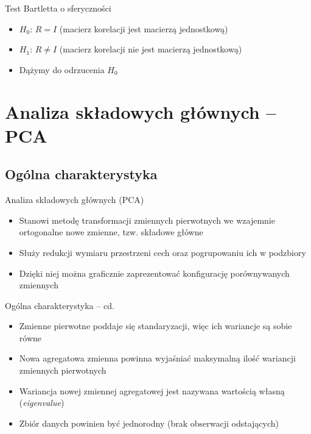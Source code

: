 \documentclass{beamer}
\begin{document}
\begin{frame}{Test Bartletta o sferyczności}
  \begin{itemize}
  \item $H_0$: $R = I$ (macierz korelacji jest macierzą jednostkową)
  \item $H_1$: $R \ne I$ (macierz korelacji nie jest macierzą jednostkową)
  \item Dążymy do odrzucenia $H_0$
  \end{itemize}
\end{frame}


\section{Analiza składowych głównych -- PCA}

\subsection{Ogólna charakterystyka}
\begin{frame}{Analiza składowych głównych (PCA)}
  \begin{itemize}
  \item Stanowi metodę transformacji zmiennych pierwotnych we wzajemnie ortogonalne nowe zmienne, tzw. składowe główne
  \item Służy redukcji wymiaru przestrzeni cech oraz pogrupowaniu ich w podzbiory
  \item Dzięki niej można graficznie zaprezentować konfigurację porównywanych zmiennych
   \end{itemize}
\end{frame}

\begin{frame}{Ogólna charakterystyka -- cd.}
  \begin{itemize}
  \item Zmienne pierwotne poddaje się standaryzacji, więc ich wariancje są sobie równe
  \item Nowa agregatowa zmienna powinna wyjaśniać maksymalną ilość wariancji zmiennych pierwotnych
  \item Wariancja nowej zmiennej agregatowej jest nazywana wartością własną (\emph{eigenvalue})
   \item Zbiór danych powinien być jednorodny (brak obserwacji odstających)
   \end{itemize}
\end{frame}
\end{document}
